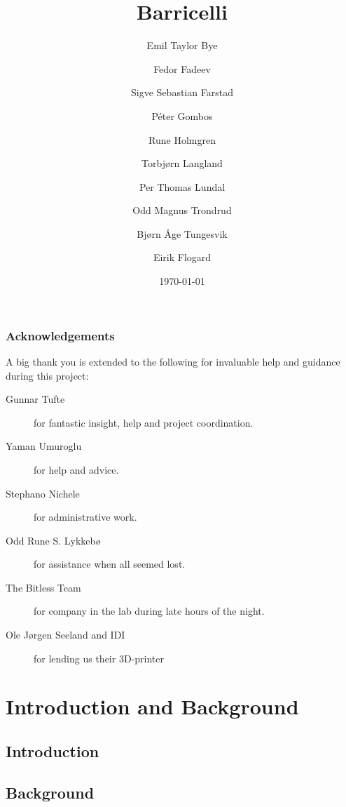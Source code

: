 \documentclass[a4paper]{report}
\title{Barricelli}
\date{\today}
\author{Emil Taylor Bye
     \and Fedor Fadeev
     \and Sigve Sebastian Farstad
     \and Péter Gombos
     \and Rune Holmgren
     \and Torbjørn Langland
     \and Per Thomas Lundal
     \and Odd Magnus Trondrud
     \and Bjørn Åge Tungesvik
     \and Eirik Flogard
}
\begin{document}



\newpage
\thispagestyle{empty}
\mbox{}
\newpage

\begin{abstract}
	
\end{abstract}

\thispagestyle{empty}
\section*{Acknowledgements}
A big thank you is extended to the following for invaluable help and guidance during this project:

\begin{description}
\item[Gunnar Tufte] for fantastic insight, help and project coordination.
\item[Yaman Umuroglu] for help and advice.
\item[Stephano Nichele] for administrative work.
\item[Odd Rune S. Lykkebø] for assistance when all seemed lost.
\item[The Bitless Team] for company in the lab during late hours of the night.
\item[Ole Jørgen Seeland and IDI] for lending us their 3D-printer
\end{description}

\setcounter{page}{3}

\tableofcontents
\newpage

\listoffigures
\listoftables
\listofalgorithms
\renewcommand{\lstlistlistingname}{List of Listings}
\lstlistoflistings

\newpage
\setcounter{page}{1}

\part{Introduction and Background}

\chapter{Introduction}
	

\chapter{Background}
	
\end{document}
